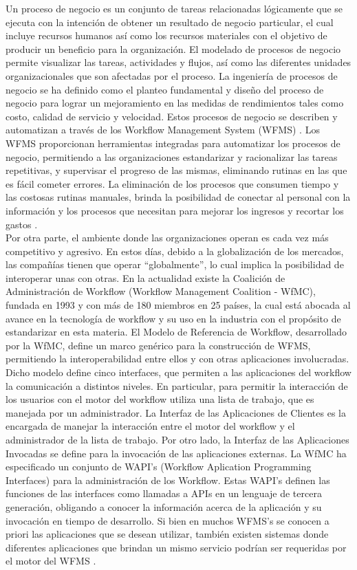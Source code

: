 Un proceso de negocio es un conjunto de tareas relacionadas lógicamente que se ejecuta con la intención de obtener un resultado de negocio particular, el cual incluye recursos humanos así como los recursos materiales con el objetivo de producir un beneficio para la organización. El modelado de procesos de negocio permite visualizar las tareas, actividades y flujos, así como las diferentes unidades organizacionales que son afectadas por el proceso. La ingeniería de procesos de negocio se ha definido como el planteo fundamental y diseño del proceso de negocio para lograr un mejoramiento en las medidas de rendimientos tales como costo, calidad de servicio y velocidad. Estos procesos de negocio se describen y automatizan a través de los Workflow Management System (WFMS) . Los WFMS proporcionan herramientas integradas para automatizar los procesos de negocio, permitiendo a las organizaciones estandarizar y racionalizar las tareas repetitivas, y supervisar el progreso de las mismas, eliminando rutinas en las que es fácil cometer errores. La eliminación de los procesos que consumen tiempo y las costosas rutinas manuales, brinda la posibilidad de conectar al personal con la información y los procesos que necesitan para mejorar los ingresos y recortar los gastos \cite{WfMCa}.\\

Por otra parte, el ambiente donde las organizaciones operan es cada vez más competitivo y agresivo. En estos días, debido a la globalización de los mercados, las compañías tienen que operar “globalmente”, lo cual implica la posibilidad de interoperar unas con otras. En la actualidad existe la Coalición de Administración de Workflow (Workflow Management Coalition - WfMC), fundada en 1993 y con más de 180 miembros en 25 países, la cual está abocada al avance en la tecnología de workflow y su uso en la industria con el propósito de estandarizar en esta materia. El Modelo de Referencia de Workflow, desarrollado por la WfMC, define un marco genérico para la construcción de WFMS, permitiendo la interoperabilidad entre ellos y con otras aplicaciones involucradas. Dicho modelo define cinco interfaces, que permiten a las aplicaciones del workflow la comunicación a distintos niveles. En particular, para permitir la interacción de los usuarios con el motor del workflow utiliza una lista de trabajo, que es manejada por un administrador. La Interfaz de las Aplicaciones de Clientes es la encargada de manejar la interacción entre el motor del workflow y el administrador de la lista de trabajo. Por otro lado, la Interfaz de las Aplicaciones Invocadas se define para la invocación de las aplicaciones externas. La WfMC ha especificado un conjunto de WAPI's (Workflow Aplication Programming Interfaces) para la administración de los Workflow. Estas WAPI's definen las funciones de las interfaces como llamadas a APIs en un lenguaje de tercera generación, obligando a conocer la información acerca de la aplicación y su invocación en tiempo de desarrollo. Si bien en muchos WFMS's se conocen a priori las aplicaciones que se desean utilizar, también existen sistemas donde diferentes aplicaciones que brindan un mismo servicio podrían ser requeridas por el motor del WFMS \cite{WfMC09}.\\

